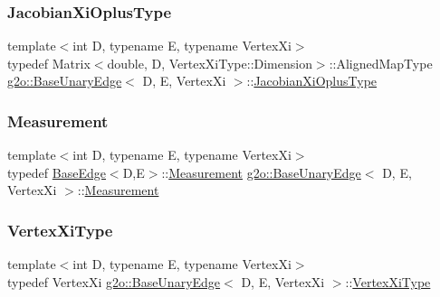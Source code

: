 \mbox{\label{classg2o_1_1_base_unary_edge_a24bcabd661223e15b7337f2835310f5e}} 
\subsubsection{\texorpdfstring{Jacobian\+Xi\+Oplus\+Type}{JacobianXiOplusType}}
{\footnotesize\ttfamily template$<$int D, typename E, typename Vertex\+Xi$>$ \\
typedef Matrix$<$double, D, Vertex\+Xi\+Type\+::\+Dimension$>$\+::Aligned\+Map\+Type \mbox{\hyperlink{classg2o_1_1_base_unary_edge}{g2o\+::\+Base\+Unary\+Edge}}$<$ D, E, Vertex\+Xi $>$\+::\mbox{\hyperlink{classg2o_1_1_base_unary_edge_a24bcabd661223e15b7337f2835310f5e}{Jacobian\+Xi\+Oplus\+Type}}}

\mbox{\label{classg2o_1_1_base_unary_edge_ab953b076b4c35fcf99de02bd0bfcc1ae}} 
\subsubsection{\texorpdfstring{Measurement}{Measurement}}
{\footnotesize\ttfamily template$<$int D, typename E, typename Vertex\+Xi$>$ \\
typedef \mbox{\hyperlink{classg2o_1_1_base_edge}{Base\+Edge}}$<$D,E$>$\+::\mbox{\hyperlink{classg2o_1_1_base_edge_a2c148abba650a20b8c7eed75d3e2211e}{Measurement}} \mbox{\hyperlink{classg2o_1_1_base_unary_edge}{g2o\+::\+Base\+Unary\+Edge}}$<$ D, E, Vertex\+Xi $>$\+::\mbox{\hyperlink{classg2o_1_1_base_edge_a2c148abba650a20b8c7eed75d3e2211e}{Measurement}}}

\mbox{\label{classg2o_1_1_base_unary_edge_a503e62e74775172c008135650850d511}} 
\subsubsection{\texorpdfstring{Vertex\+Xi\+Type}{VertexXiType}}
{\footnotesize\ttfamily template$<$int D, typename E, typename Vertex\+Xi$>$ \\
typedef Vertex\+Xi \mbox{\hyperlink{classg2o_1_1_base_unary_edge}{g2o\+::\+Base\+Unary\+Edge}}$<$ D, E, Vertex\+Xi $>$\+::\mbox{\hyperlink{classg2o_1_1_base_unary_edge_a503e62e74775172c008135650850d511}{Vertex\+Xi\+Type}}}



